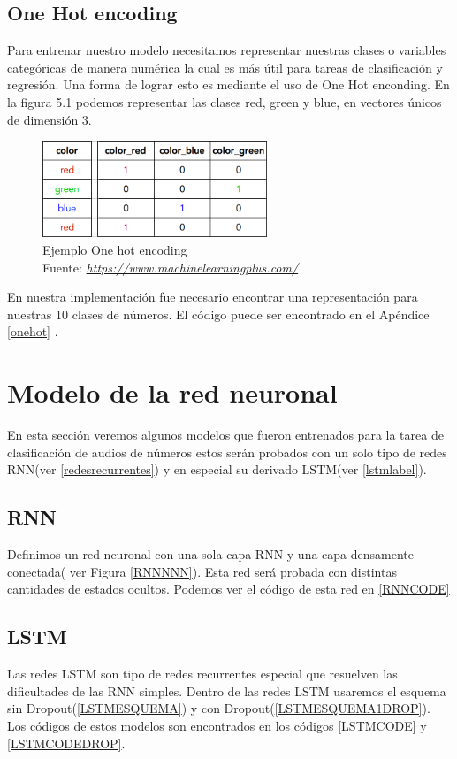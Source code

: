 \subsection{One Hot encoding }
Para entrenar nuestro modelo necesitamos representar nuestras clases o variables categóricas de manera numérica la cual es más útil para tareas de clasificación y regresión. Una forma de lograr esto es mediante el uso de One Hot enconding. En la figura 5.1 podemos representar las clases red, green y blue, en vectores únicos de dimensión 3.

\begin{figure}[H]
	\centering
	\includegraphics[width=0.6\textwidth]{Figures/one_hot_encoding}
	\caption{Ejemplo One hot encoding \\ Fuente:  \href{https://www.machinelearningplus.com/machine-learning/caret-package/attachment/one-hot-encoding/}{\textit{https://www.machinelearningplus.com/}}}
	\label{one}
\end{figure} 
En nuestra implementación fue necesario encontrar una representación para nuestras 10 clases de números. El código puede ser encontrado en el Apéndice \ref{onehot} .


\section{Modelo de la red neuronal}

En esta sección  veremos algunos modelos que fueron entrenados para la tarea de clasificación de audios de números estos serán probados con un solo tipo de redes RNN(ver \ref{redesrecurrentes}) y en especial su derivado LSTM(ver \ref{lstmlabel}).
\subsection{RNN}
Definimos un red neuronal con una sola capa RNN y una capa densamente conectada( ver Figura \ref{RNNNNN}). Esta red será probada con distintas cantidades de estados ocultos. Podemos ver el código de esta red en \ref{RNNCODE}



\subsection{LSTM}
Las redes LSTM son tipo de redes recurrentes especial que resuelven las dificultades de las RNN simples.
Dentro de las redes LSTM usaremos el esquema sin Dropout(\ref{LSTMESQUEMA}) y con Dropout(\ref{LSTMESQUEMA1DROP}). Los códigos de estos modelos son encontrados en los códigos \ref{LSTMCODE} y \ref{LSTMCODEDROP}.


